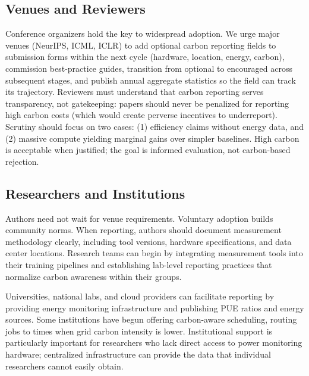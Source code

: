 \documentclass{article}
\theoremstyle{plain}
\theoremstyle{definition}
\theoremstyle{remark}
\begin{document}
\subsection{Venues and Reviewers}
\label{sec:reviewers}

Conference organizers hold the key to widespread adoption. We urge major venues (NeurIPS, ICML, ICLR) to add optional carbon reporting fields to submission forms within the next cycle (hardware, location, energy, carbon), commission best-practice guides, transition from optional to encouraged across subsequent stages, and publish annual aggregate statistics so the field can track its trajectory. Reviewers must understand that carbon reporting serves transparency, not gatekeeping: papers should never be penalized for reporting high carbon costs (which would create perverse incentives to underreport). Scrutiny should focus on two cases: (1) efficiency claims without energy data, and (2) massive compute yielding marginal gains over simpler baselines. High carbon is acceptable when justified; the goal is informed evaluation, not carbon-based rejection.

\subsection{Researchers and Institutions}

Authors need not wait for venue requirements. Voluntary adoption builds community norms. When reporting, authors should document measurement methodology clearly, including tool versions, hardware specifications, and data center locations. Research teams can begin by integrating measurement tools into their training pipelines and establishing lab-level reporting practices that normalize carbon awareness within their groups.

Universities, national labs, and cloud providers can facilitate reporting by providing energy monitoring infrastructure and publishing PUE ratios and energy sources. Some institutions have begun offering carbon-aware scheduling, routing jobs to times when grid carbon intensity is lower. Institutional support is particularly important for researchers who lack direct access to power monitoring hardware; centralized infrastructure can provide the data that individual researchers cannot easily obtain.
\end{document}
